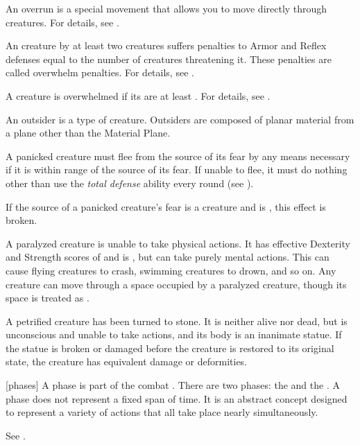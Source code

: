  An overrun is a special movement that allows you to move directly through creatures.
For details, see .

 An creature  by at least two creatures suffers penalties to Armor and Reflex defenses equal to the number of creatures threatening it.
These penalties are called overwhelm penalties.
For details, see .

 A creature is overwhelmed if its  are at least .
For details, see .

 An outsider is a type of creature.
Outsiders are composed of planar material from a plane other than the Material Plane.

 A panicked creature must flee from the source of its fear by any means necessary if it is within \rngmed range of the source of its fear.
If unable to flee, it must do nothing other than use the \textit{total defense} ability every round (see ).

If the source of a panicked creature's fear is a creature and is , this effect is broken.

 A paralyzed creature is unable to take physical actions. It has effective Dexterity and Strength scores of  and is \helpless, but can take purely mental actions. This can cause flying creatures to crash, swimming creatures to drown, and so on. Any creature can move through a space occupied by a paralyzed creature, though its space is treated as .

 A petrified creature has been turned to stone. It is neither alive nor dead, but is unconscious and unable to take actions, and its body is an inanimate statue. If the statue is broken or damaged before the creature is restored to its original state, the creature has equivalent damage or deformities.

[phases] A phase is part of the combat .
There are two phases: the  and the .
A phase does not represent a fixed span of time.
It is an abstract concept designed to represent a variety of actions that all take place nearly simultaneously.

 See .

